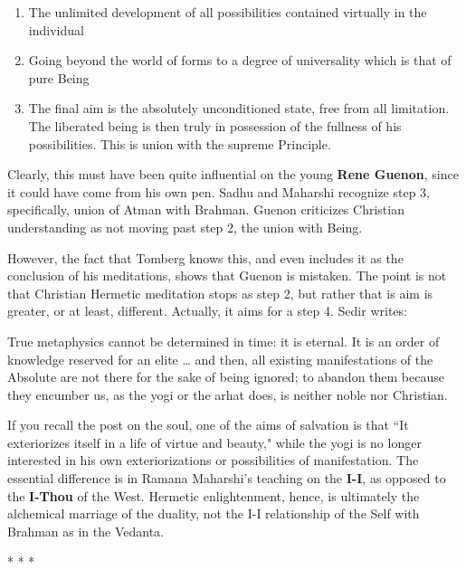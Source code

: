 \begin{enumerate}
\item The unlimited development of all possibilities contained virtually in the individual 
\item Going beyond the world of forms to a degree of universality which is that of pure Being 
\item The final aim is the absolutely unconditioned state, free from all limitation. The liberated being is then truly in possession of the fullness of his possibilities. This is union with the supreme Principle. 
\end{enumerate}
Clearly, this must have been quite influential on the young \textbf{Rene Guenon}, since it could have come from his own pen. Sadhu and Maharshi recognize step 3, specifically, union of Atman with Brahman. Guenon criticizes Christian understanding as not moving past step 2, the union with Being.

However, the fact that Tomberg knows this, and even includes it as the conclusion of his meditations, shows that Guenon is mistaken. The point is not that Christian Hermetic meditation stops as step 2, but rather that is aim is greater, or at least, different. Actually, it aims for a step 4. Sedir writes:

\begin{quotex}
True metaphysics cannot be determined in time: it is eternal. It is an order of knowledge reserved for an elite … and then, all existing manifestations of the Absolute are not there for the sake of being ignored; to abandon them because they encumber us, as the yogi or the arhat does, is neither noble nor Christian. 

\end{quotex}
If you recall the post on the soul, one of the aims of salvation is that ``It exteriorizes itself in a life of virtue and beauty," while the yogi is no longer interested in his own exteriorizations or possibilities of manifestation. The essential difference is in Ramana Maharshi's teaching on the \textbf{I-I}, as opposed to the \textbf{I-Thou} of the West. Hermetic enlightenment, hence, is ultimately the alchemical marriage of the duality, not the I-I relationship of the Self with Brahman as in the Vedanta.




\begin{center}* * *\end{center}

